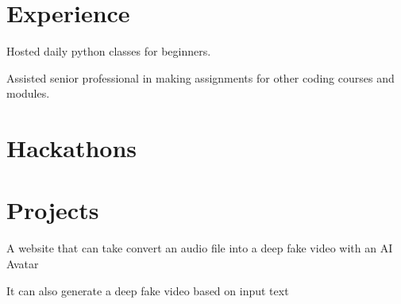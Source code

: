 \documentclass[]{deedy-resume-openfont}
\begin{document}
\hfill
\begin{minipage}[t]{0.66\textwidth} 


\section{Experience}

\vspace{\topsep} %
\begin{tightemize}
\item Hosted daily python classes for beginners.
\item Assisted senior professional in making assignments for other coding courses and modules.
\end{tightemize}
\sectionsep


\section{Hackathons}
\sectionsep

\sectionsep

\sectionsep


\section{Projects}
\begin{tightemize}
\item A website that can take convert an audio file into a deep fake video with an AI Avatar
\item It can also generate a deep fake video based on input text
\end{tightemize}
\sectionsep


\end{minipage}
\end{document}
